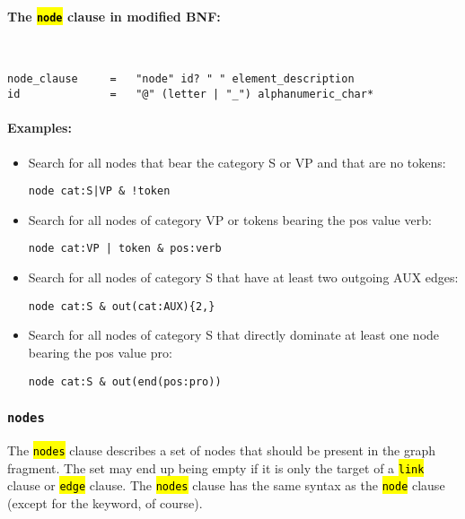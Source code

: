 \documentclass[12pt]{scrartcl}
\newcommand{\code}[1]{\hl{\texttt{#1}}}
\begin{document}
\paragraph*{The \code{node} clause in modified BNF:}
~
\begin{lstlisting}
node_clause     =   "node" id? " " element_description
id              =   "@" (letter | "_") alphanumeric_char*
\end{lstlisting}

\paragraph*{Examples:}
\begin{itemize}
	\item Search for all nodes that bear the category S or VP and that are no tokens:
	\begin{lstlisting}[gobble=8,aboveskip=.6em,belowskip=.2em]
		node cat:S|VP & !token
	\end{lstlisting}
	\item Search for all nodes of category VP or tokens bearing the pos value verb:
	\begin{lstlisting}[gobble=8,aboveskip=.6em,belowskip=.2em]
		node cat:VP | token & pos:verb
	\end{lstlisting}
	\item Search for all nodes of category S that have at least two outgoing AUX edges:
	\begin{lstlisting}[gobble=8,aboveskip=.6em,belowskip=.2em]
		node cat:S & out(cat:AUX){2,}
	\end{lstlisting}
	\item Search for all nodes of category S that directly dominate at least one node bearing the pos value pro:
	\begin{lstlisting}[gobble=8,aboveskip=.6em,belowskip=.2em]
		node cat:S & out(end(pos:pro))
	\end{lstlisting}
\end{itemize}


\subsubsection{\texttt{nodes}}

The \code{nodes} clause describes a set of nodes that should be present in the graph fragment.
The set may end up being empty if it is only the target of a \code{link} clause or \code{edge} clause.
The \code{nodes} clause has the same syntax as the \code{node} clause (except for the keyword, of course).
\end{document}
